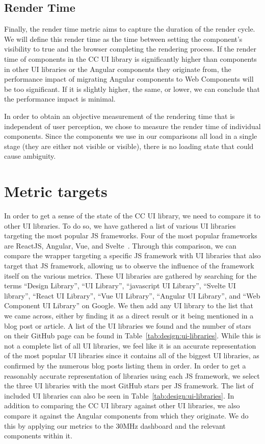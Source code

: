 \subsection{Render Time}
Finally, the render time metric aims to capture the duration of the render cycle. We will define this render time as the time between setting the component's visibility to true and the browser completing the rendering process. If the render time of components in the CC UI library is significantly higher than components in other UI libraries or the Angular components they originate from, the performance impact of migrating Angular components to Web Components will be too significant. If it is slightly higher, the same, or lower, we can conclude that the performance impact is minimal.

In order to obtain an objective measurement of the rendering time that is independent of user perception, we chose to measure the render time of individual components. Since the components we use in our comparisons all load in a single stage (they are either not visible or visible), there is no loading state that could cause ambiguity.

\section{Metric targets}
In order to get a sense of the state of the CC UI library, we need to compare it to other UI libraries. To do so, we have gathered a list of various UI libraries targeting the most popular JS frameworks. Four of the most popular frameworks are ReactJS, Angular, Vue, and Svelte~. Through this comparison, we can compare the wrapper targeting a specific JS framework with UI libraries that also target that JS framework, allowing us to observe the influence of the framework itself on the various metrics. These UI libraries are gathered by searching for the terms ``Design Library'', ``UI Library'', ``javascript UI Library'', ``Svelte UI library'', ``React UI Library'', ``Vue UI Library'', ``Angular UI Library'', and ``Web Component UI Library'' on Google. We then add any UI library to the list that we came across, either by finding it as a direct result or it being mentioned in a blog post or article. A list of the UI libraries we found and the number of stars on their GitHub page can be found in Table~\ref{tab:design:ui-libraries}. While this is not a complete list of all UI libraries, we feel like it is an accurate representation of the most popular UI libraries since it contains all of the biggest UI libraries, as confirmed by the numerous blog posts listing them in order. In order to get a reasonably accurate representation of libraries using each JS framework, we select the three UI libraries with the most GitHub stars per JS framework. The list of included UI libraries can also be seen in Table~\ref{tab:design:ui-libraries}. In addition to comparing the CC UI library against other UI libraries, we also compare it against the Angular components from which they originate. We do this by applying our metrics to the 30MHz dashboard and the relevant components within it.

